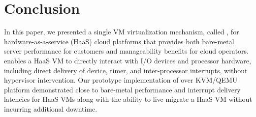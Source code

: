 \section{Conclusion}

In this paper, we presented a single VM virtualization 
mechanism, called \sna, for hardware-as-a-service (HaaS) cloud platforms
that provides both bare-metal server performance for customers
and manageability benefits for cloud operators.
\na enables a HaaS VM to directly interact with I/O devices and 
processor hardware, including direct delivery of device,
timer, and inter-processor interrupts, without hypervisor intervention.
Our prototype implementation of \na over KVM/QEMU platform 
demonstrated close to bare-metal performance and
interrupt delivery latencies for HaaS VMs along with the
ability to live migrate a HaaS VM without incurring 
additional downtime. 
